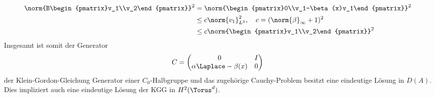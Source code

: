 \begin{align*}
\norm{B\begin{pmatrix}v_1\\v_2\end{pmatrix}}^2&=\norm{\begin{pmatrix}0\\v_1-\beta(x)v_1\end{pmatrix}}^2\\
&\le c\norm{v_1}_{L^2}^2, \quad c=(\norm{\beta}_{\infty}+1)^2\\
&\le c\norm{\begin{pmatrix}v_1\\v_2\end{pmatrix}}^2
\end{align*}
Insgesamt ist somit der Generator 
\[C=\begin{pmatrix}0 & I\\ \alpha\Laplace - \beta(x) & 0\end{pmatrix}\]
der Klein-Gordon-Gleichung Generator einer $C_0$-Halbgruppe und das zugehörige Cauchy-Problem besitzt eine eindeutige Lösung in $D(A)$. Dies impliziert auch eine eindeutige Lösung der KGG in $H^2(\Torus^d)$.

